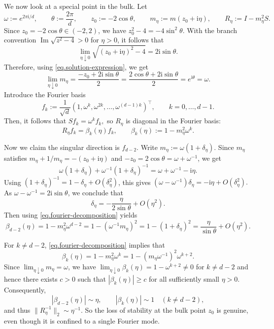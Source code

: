 \documentclass[11pt,twoside, a4paper]{article}
\numberwithin{equation}{section}
\numberwithin{figure}{section}
\theoremstyle{plain} %
\theoremstyle{definition}
\theoremstyle{remark}
\newcommand{\1} {\mspace{1 mu}}
\newcommand{\2} {\mspace{2 mu}}
\DeclareMathOperator{\im}{Im}
\begin{document}
We now look at a special point in the bulk. Let
\[
\omega:=e^{2\pi \mathrm i/d},\qquad \theta:=\frac{2\pi}{d},\qquad z_0:=-2\cos\theta,\qquad m_\eta:=m(z_0+\mathrm i\eta),\qquad R_\eta:=I-m_\eta^2S.
\]
Since \(z_0=-2\cos\theta\in(-2,2)\), we have
$
    z_0^2-4=-4\sin^2\theta .
$
With the branch convention \(\im\sqrt{z^2-4}>0\) for \(\eta>0\), it follows that
\[
    \lim_{\eta\downarrow0}\sqrt{(z_0+\mathrm i\eta)^2-4}
    =
    2\mathrm i\sin\theta .
\]
Therefore, using \eqref{eq.solution-expression}, we get
\[
    \lim_{\eta\downarrow0}m_\eta
    =
    \frac{-z_0+2\mathrm i\sin\theta}{2}
    =
    \frac{2\cos\theta+2\mathrm i\sin\theta}{2}
    =
    e^{\mathrm i\theta}
    =
    \omega .
\]
Introduce the Fourier basis
\[
f_k:=\frac1{\sqrt d}(1,\omega^k,\omega^{2k},\dots,\omega^{(d-1)k})^\top,
\qquad k=0,\dots,d-1.
\]
Then, it follows that
$
Sf_k=\omega^k f_k,
$
so \(R_\eta\) is diagonal in the Fourier basis:
\begin{equation}\label{eq.fourier-decomposition}
  R_\eta f_k=\beta_k(\eta)f_k,\qquad \beta_k(\eta):=1-m_\eta^2\omega^k.
\end{equation}



Now we claim the singular direction is \(f_{d-2}\). 
Write \(m_\eta:=\omega(1+\delta_\eta)\). Since \(m_\eta\) satisfies
$
    m_\eta+1/{m_\eta}=-(z_0+\mathrm i\eta)
$
and \(-z_0=2\cos\theta=\omega+\omega^{-1}\), we get
\[
    \omega(1+\delta_\eta)
    +
    \omega^{-1}(1+\delta_\eta)^{-1}
    =
    \omega+\omega^{-1}-\mathrm i\eta .
\]
Using \((1+\delta_\eta)^{-1}=1-\delta_\eta+O(\delta_\eta^2)\), this gives
$
    (\omega-\omega^{-1})\delta_\eta
    =
    -\mathrm i\eta+O(\delta_\eta^2).
$
As \(\omega-\omega^{-1}=2\mathrm i\sin\theta\), we conclude that
\[
    \delta_\eta
    =
    -\frac{\eta}{2\sin\theta}+O(\eta^2).
\]
Then using \eqref{eq.fourier-decomposition} yields
\[
    \beta_{d-2}(\eta)=1-m_\eta^2\omega^{d-2}=1-(\omega^{-1}m_\eta)^2=1-(1+\delta_\eta)^2=\frac{\eta}{\sin\theta}+O(\eta^2).
\]



For \(k\neq d-2\), \eqref{eq.fourier-decomposition} implies that
\[
\beta_k(\eta)=1-m_\eta^2\omega^k=1-(m_\eta\omega^{-1})^2\omega^{k+2}.
\]
Since \(\lim_{\eta\downarrow 0}m_\eta=\omega\), we have
$
\lim_{\eta\downarrow 0}\beta_k(\eta)= 1-\omega^{k+2}\neq0
$
for $k\neq d-2$
and hence there exists \(c>0\) such that
$
|\beta_k(\eta)|\ge c
$
for all sufficiently small \(\eta>0\). Consequently,
\[
|\beta_{d-2}(\eta)|\sim\eta,
\qquad
|\beta_k(\eta)|\sim1\quad (k\neq d-2),
\]
and thus
$
\|R_\eta^{-1}\|_2\sim \eta^{-1}.
$
So the loss of stability at the bulk point \(z_0\) is genuine, even though it is confined to a single Fourier mode.




  
\end{document}
